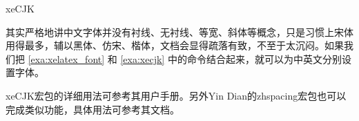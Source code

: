 \begin{example}[h]
\begin{Code}[numbers=left]
\usepackage[CJKchecksingle,CJKnumber]{xeCJK}
\end{Code}
\caption{xeCJK}
\label{exa:xecjk}
\end{example}

其实严格地讲中文字体并没有衬线、无衬线、等宽、斜体等概念，只是习惯上宋体用得最多，辅以黑体、仿宋、楷体，文档会显得疏落有致，不至于太沉闷。如果我们把 \autoref{exa:xelatex_font} 和 \autoref{exa:xecjk} 中的命令结合起来，就可以为中英文分别设置字体。

xeCJK宏包的详细用法可参考其用户手册\citep{Sun_2009}。另外Yin Dian的zhspacing宏包也可以完成类似功能，具体用法可参考其文档\citep{Yin_2007}。



